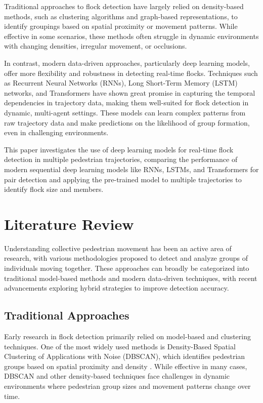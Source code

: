 \documentclass{article}
\begin{document}
Traditional approaches to flock detection have largely relied on density-based methods, such as clustering algorithms and graph-based representations, to identify groupings based on spatial proximity or movement patterns. While effective in some scenarios, these methods often struggle in dynamic environments with changing densities, irregular movement, or occlusions.

In contrast, modern data-driven approaches, particularly deep learning models, offer more flexibility and robustness in detecting real-time flocks. Techniques such as Recurrent Neural Networks (RNNs), Long Short-Term Memory (LSTM) networks, and Transformers have shown great promise in capturing the temporal dependencies in trajectory data, making them well-suited for flock detection in dynamic, multi-agent settings. These models can learn complex patterns from raw trajectory data and make predictions on the likelihood of group formation, even in challenging environments.

This paper investigates the use of deep learning models for real-time flock detection in multiple pedestrian trajectories, comparing the performance of modern sequential deep learning models like RNNs, LSTMs, and Transformers for pair detection and applying the pre-trained model to multiple trajectories to identify flock size and members.


\section{Literature Review}

Understanding collective pedestrian movement has been an active area of research, with various methodologies proposed to detect and analyze groups of individuals moving together. These approaches can broadly be categorized into traditional model-based methods and modern data-driven techniques, with recent advancements exploring hybrid strategies to improve detection accuracy.

\subsection{Traditional Approaches}

Early research in flock detection primarily relied on model-based and clustering techniques. One of the most widely used methods is Density-Based Spatial Clustering of Applications with Noise (DBSCAN), which identifies pedestrian groups based on spatial proximity and density \cite{ester1996density}. While effective in many cases, DBSCAN and other density-based techniques face challenges in dynamic environments where pedestrian group sizes and movement patterns change over time.
\end{document}
